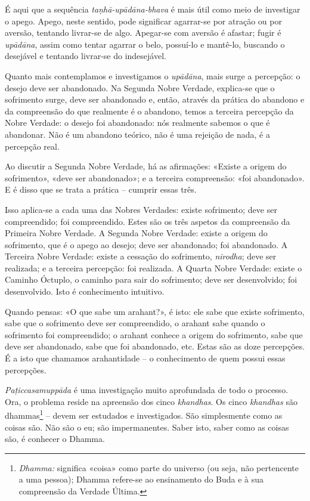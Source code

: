 É aqui que a sequência \emph{taṇhā-upādāna-bhava} é mais útil como meio de
investigar o apego. Apego, neste sentido, pode significar agarrar-se por
atração ou por aversão, tentando livrar-se de algo. Apegar-se com aversão é
afastar; fugir é \emph{upādāna}, assim como tentar agarrar o belo, possuí-lo e
mantê-lo, buscando o desejável e tentando livrar-se do indesejável.

Quanto mais contemplamos e investigamos o \emph{upādāna}, mais surge a
percepção: o desejo deve ser abandonado. Na Segunda Nobre Verdade, explica-se
que o sofrimento surge, deve ser abandonado e, então, através da prática do
abandono e da compreensão do que realmente é o abandono, temos a terceira
percepção da Nobre Verdade: o desejo foi abandonado: nós realmente sabemos o que
é abandonar. Não é um abandono teórico, não é uma rejeição de nada, é a
percepção real.

Ao discutir a Segunda Nobre Verdade, há as afirmações: «Existe a origem do
sofrimento», «deve ser abandonado»; e a terceira compreensão: «foi abandonado».
E é disso que se trata a prática -- cumprir essas três.

Isso aplica-se a cada uma das Nobres Verdades: existe sofrimento; deve ser
compreendido; foi compreendido. Estes são os três aspetos da compreensão da
Primeira Nobre Verdade. A Segunda Nobre Verdade: existe a origem do sofrimento,
que é o apego ao desejo; deve ser abandonado; foi abandonado. A Terceira Nobre
Verdade: existe a cessação do sofrimento, \emph{nirodha}; deve ser realizada; e
a terceira percepção: foi realizada. A Quarta Nobre Verdade: existe o Caminho
Óctuplo, o caminho para sair do sofrimento; deve ser desenvolvido; foi
desenvolvido. Isto é conhecimento intuitivo.

Quando pensas: «O que sabe um arahant?», é isto: ele sabe que existe sofrimento,
sabe que o sofrimento deve ser compreendido, o arahant sabe quando o sofrimento
foi compreendido; o arahant conhece a origem do sofrimento, sabe que deve ser
abandonado, sabe que foi abandonado, etc. Estas são as doze percepções. É a isto
que chamamos arahantidade -- o conhecimento de quem possui essas percepções.

\emph{Paṭiccasamuppāda} é uma investigação muito aprofundada de todo o processo.
Ora, o problema reside na apreensão dos cinco \emph{khandhas}. Os cinco
\emph{khandhas} são dhammas\footnote{\emph{Dhamma:} significa «coisa» como parte
  do universo (ou seja, não pertencente a uma pessoa); Dhamma refere-se ao
  ensinamento do Buda e à sua compreensão da Verdade Última.} -- devem ser
estudados e investigados. São simplesmente como as coisas são. Não são o eu; são
impermanentes. Saber isto, saber como as coisas são, é conhecer o Dhamma.

